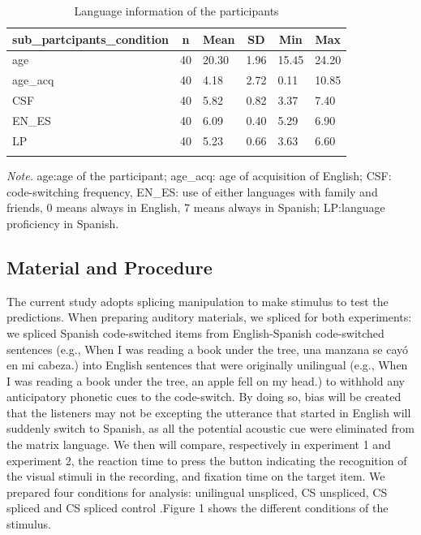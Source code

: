\documentclass[
  english,
  man,floatsintext]{apa6}
\begin{document}
\begin{table}[tbp]

\begin{center}
\begin{threeparttable}

\caption{\label{tab:data participants}Language information of the participants}

\begin{tabular}{llllll}
\toprule
sub\_partcipants\_condition & \multicolumn{1}{c}{n} & \multicolumn{1}{c}{Mean} & \multicolumn{1}{c}{SD} & \multicolumn{1}{c}{Min} & \multicolumn{1}{c}{Max}\\
\midrule
age & 40 & 20.30 & 1.96 & 15.45 & 24.20\\
age\_acq & 40 & 4.18 & 2.72 & 0.11 & 10.85\\
CSF & 40 & 5.82 & 0.82 & 3.37 & 7.40\\
EN\_ES & 40 & 6.09 & 0.40 & 5.29 & 6.90\\
LP & 40 & 5.23 & 0.66 & 3.63 & 6.60\\
\bottomrule
\addlinespace
\end{tabular}

\begin{tablenotes}[para]
\normalsize{\textit{Note.} age:age of the participant; age\_acq: age of acquisition of English; CSF: code-switching frequency, EN\_ES: use of either languages with family and friends, 0 means always in English, 7 means always in Spanish; LP:language proficiency in Spanish.}
\end{tablenotes}

\end{threeparttable}
\end{center}

\end{table}

\hypertarget{material-and-procedure}{%
\subsection{Material and Procedure}\label{material-and-procedure}}

The current study adopts splicing manipulation to make stimulus to test the predictions. When preparing auditory materials, we spliced for both experiments: we spliced Spanish code-switched items from English-Spanish code-switched sentences (e.g., When I was reading a book under the tree, una manzana se cayó en mi cabeza.) into English sentences that were originally unilingual (e.g., When I was reading a book under the tree, an apple fell on my head.) to withhold any anticipatory phonetic cues to the code-switch. By doing so, bias will be created that the listeners may not be excepting the utterance that started in English will suddenly switch to Spanish, as all the potential acoustic cue were eliminated from the matrix language. We then will compare, respectively in experiment 1 and experiment 2, the reaction time to press the button indicating the recognition of the visual stimuli in the recording, and fixation time on the target item. We prepared four conditions for analysis: unilingual unspliced, CS unspliced, CS spliced and CS spliced control .Figure 1 shows the different conditions of the stimulus.
\end{document}
